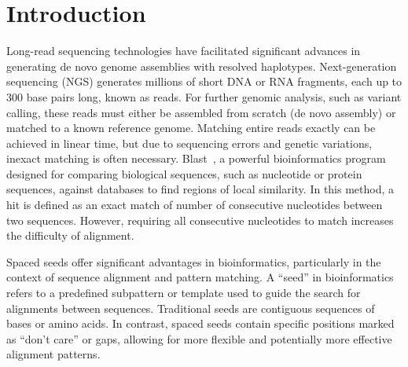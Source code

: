 \documentclass[PhD]{PHlab-thesis}
\begin{document}


\renewcommand\nomgroup[1]{%
  \item[\bfseries
  \ifstrequal{#1}{A}{General}{%
  \ifstrequal{#1}{B}{Metrics}{%
  \ifstrequal{#1}{C}{Variants}{%
  \ifstrequal{#1}{Z}{Gene/Protein Names}%
  }}}]}


\printnomenclature[5cm]

\newpage
\setcounter{page}{1}



\chapter{Introduction}
Long-read sequencing technologies have facilitated significant advances in generating de novo genome assemblies with resolved haplotypes. Next-generation sequencing (NGS) generates millions of short DNA or RNA fragments, each up to 300 base pairs long, known as reads. For further genomic analysis, such as variant calling, these reads must either be assembled from scratch (de novo assembly) or matched to a known reference genome. Matching entire reads exactly can be achieved in linear time, but due to sequencing errors and genetic variations, inexact matching is often necessary. Blast~\cite{Blast}, a powerful bioinformatics program designed for comparing biological sequences, such as nucleotide or protein sequences, against databases to find regions of local similarity. In this method, a hit is defined as an exact match of number of consecutive nucleotides between two sequences. However, requiring all consecutive nucleotides to match increases the difficulty of alignment.

Spaced seeds offer significant advantages in bioinformatics, particularly in the context of sequence alignment and pattern matching. A ``seed'' in bioinformatics refers to a predefined subpattern or template used to guide the search for alignments between sequences. Traditional seeds are contiguous sequences of bases or amino acids. In contrast, spaced seeds contain specific positions marked as ``don't care'' or gaps, allowing for more flexible and potentially more effective alignment patterns. 
\end{document}
